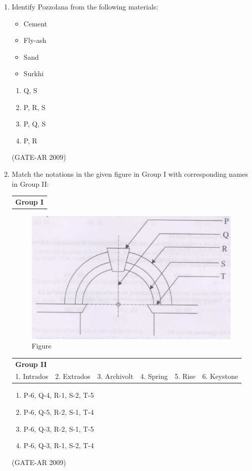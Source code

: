 \documentclass[a4paper,10pt]{article}
\begin{document}
\begin{enumerate}
    \item Identify Pozzolana from the following materials: 
    \begin{itemize}
        \item Cement
        \item Fly-ash
        \item Sand
        \item Surkhi
    \end{itemize}
    \begin{multicols}{2}
	\begin{enumerate}
        \item Q, S
        \item P, R, S
        \item P, Q, S
        \item P, R
    \end{enumerate}
	\end{multicols}
    \hfill (GATE-AR 2009)

	\item Match the notations in the given figure in Group I with corresponding names in Group II:  \\
    \begin{tabular}{ l }
	\textbf{Group I} \\
	\end{tabular}
	\begin{figure}[h!]
        \centering
        \includegraphics[width=0.5\linewidth]{figs/img_04.jpg}
	\caption{Figure}
	\label{fig:Img04}
	\end{figure}
    \begin{tabular}{ l l l l l l }
	\textbf{Group II} & & & & & \\
	1. Intrados & 2. Extrados & 3. Archivolt & 4. Spring & 5. Rise & 6. Keystone \\
	\end{tabular}	
	\begin{enumerate}
        \item P-6, Q-4, R-1, S-2, T-5
        \item P-6, Q-5, R-2, S-1, T-4
        \item P-6, Q-3, R-2, S-1, T-5
        \item P-6, Q-3, R-1, S-2, T-4
    \end{enumerate}
    \hfill (GATE-AR 2009)


\end{enumerate}
\end{document}

